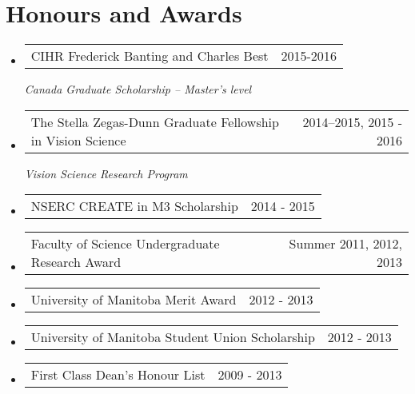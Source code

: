 \documentclass[letterpaper,12pt]{article}
\makeatletter
\newcommand{\resumeAwardItem}[3][\vspace{-7pt}]{
	\item
    \begin{tabular*}{0.94\textwidth}[t]{l@{\extracolsep{\fill}}r}
     {\small#2} & \small#3      
    \end{tabular*}
	{\textit{\small#1}}\vspace{-7pt}
}
\newcommand{\resumeItemListStart}{\begin{itemize}}
\newcommand{\resumeItemListEnd}{\end{itemize}\vspace{-5pt}}
\makeatother
\begin{document}
\section{Honours and Awards}

\resumeItemListStart
    	\resumeAwardItem[Canada Graduate Scholarship -- Master's level]{CIHR Frederick Banting and Charles Best}{2015-2016} 
	\resumeAwardItem[Vision Science Research Program]{The Stella Zegas-Dunn Graduate Fellowship in Vision Science}{2014–2015, 2015 - 2016} 
	\resumeAwardItem{NSERC CREATE in M3 Scholarship}{2014 - 2015}
	\resumeAwardItem{Faculty of Science Undergraduate Research Award}{Summer 2011, 2012, 2013}
	\resumeAwardItem{University of Manitoba Merit Award}{2012 - 2013}
	\resumeAwardItem{University of Manitoba Student Union Scholarship}{2012 - 2013}
	\resumeAwardItem{First Class Dean's Honour List}{2009 - 2013}
  \resumeItemListEnd  


\end{document}
